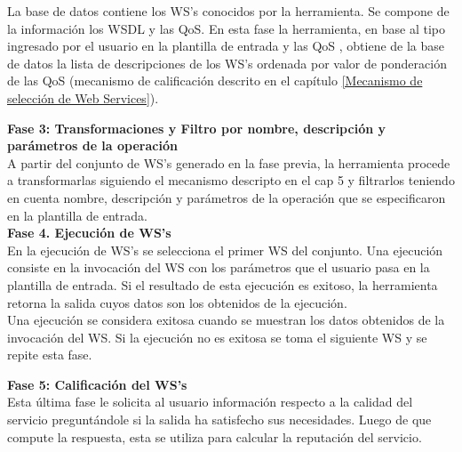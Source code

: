 La base de datos contiene los WS's conocidos por la herramienta. Se compone de la información los WSDL y las QoS.  En esta fase la herramienta, en base al tipo ingresado por el usuario en la plantilla de entrada y las QoS , obtiene de la base de datos la lista de descripciones de los WS's ordenada por valor de ponderación de las QoS (mecanismo de calificación descrito en el capítulo \ref{Mecanismo de selección de Web Services}). 






\textbf{Fase 3: Transformaciones y Filtro por nombre, descripción y parámetros de la operación}\\

A partir del conjunto de WS's generado en la fase previa, la herramienta procede a transformarlas siguiendo el mecanismo descripto en el cap 5 y filtrarlos teniendo en cuenta nombre, descripción y parámetros de la operación que se especificaron en la plantilla de entrada.\\	

\textbf{Fase 4. Ejecución de WS's}\\

En la ejecución de WS's se selecciona el primer WS del conjunto. Una ejecución consiste en la invocación del WS con los parámetros que el usuario pasa en la plantilla de entrada. Si el resultado de esta ejecución es exitoso, la herramienta retorna la salida cuyos datos son los obtenidos de la ejecución.\\
Una ejecución se considera exitosa cuando se muestran  los datos obtenidos de la invocación del WS. Si la ejecución no es exitosa se toma el siguiente WS y se repite esta fase.





\textbf{Fase 5: Calificación del WS's}\\

Esta última fase le solicita al usuario información respecto a la calidad del servicio preguntándole si la salida ha satisfecho sus necesidades. Luego de que compute la respuesta, esta se utiliza para calcular la reputación del servicio.


